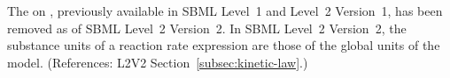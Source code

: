 The   on \KineticLaw, previously
available in SBML Level~1 and Level~2 Version~1, has been removed
as of SBML Level~2 Version~2.  In SBML Level~2 Version~2, the
substance units of a reaction rate expression are those of the
global  units of the model.  (References: L2V2
Section~\ref{subsec:kinetic-law}.)
